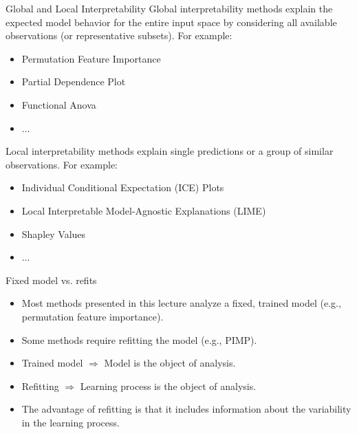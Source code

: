 \documentclass[11pt,compress,t,notes=noshow, xcolor=table]{beamer}
\begin{document}
\begin{vbframe}{Global and Local Interpretability}
Global interpretability methods explain the expected model behavior for the entire input space by considering all available observations (or representative subsets). For example:
  \begin{itemize}
    \item Permutation Feature Importance
    \item Partial Dependence Plot
    \item Functional Anova
    \item ...
  \end{itemize}
\lz
Local interpretability methods explain single predictions or a group of similar observations. For example:
 \begin{itemize}
  \item Individual Conditional Expectation (ICE) Plots
  \item Local Interpretable Model-Agnostic Explanations (LIME)
  \item Shapley Values
  \item ...
 \end{itemize}
\end{vbframe}


\begin{vbframe}{Fixed model vs. refits}
  \begin{itemize}
     \itemsep2em
     \item Most methods presented in this lecture analyze a fixed, trained model 
     (e.g., permutation feature importance).
     \item Some methods require refitting the model (e.g., PIMP).
     \item Trained model $\Rightarrow$ Model is the object of analysis.
     \item Refitting $\Rightarrow$ Learning process is the object of analysis.
     \item The advantage of refitting is that it includes information about the variability in the learning process.
  \end{itemize}
\end{vbframe}


\endlecture
\end{document}
